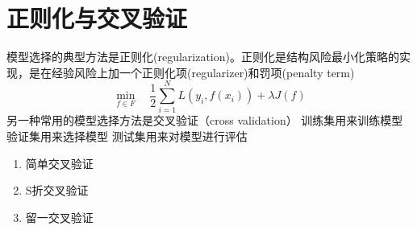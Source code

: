 \section{正则化与交叉验证}
模型选择的典型方法是正则化(regularization)。正则化是结构风险最小化策略的实现，是在经验风险上加一个正则化项(regularizer)和罚项(penalty term)
\begin{equation}
	\mathop{min}\limits_{f\in F}\quad \frac{1}{2}\sum_{i=1}^NL(y_i, f(x_i)) + \lambda J(f)
\end{equation}
另一种常用的模型选择方法是交叉验证（cross validation）
训练集用来训练模型
验证集用来选择模型 
测试集用来对模型进行评估
\begin{enumerate}
	\item 简单交叉验证
	\item S折交叉验证
	\item 留一交叉验证
\end{enumerate}
